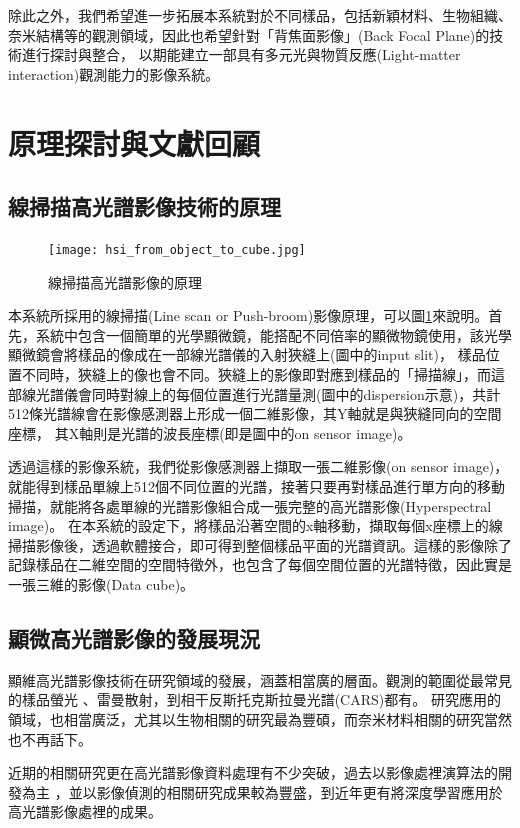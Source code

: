 \documentclass[12pt]{article}
\begin{document}
除此之外，我們希望進一步拓展本系統對於不同樣品，包括新穎材料、生物組織、奈米結構等的觀測領域，因此也希望針對「背焦面影像」(Back Focal Plane)的技術進行探討與整合，
以期能建立一部具有多元光與物質反應(Light-matter interaction)觀測能力的影像系統。

\section{原理探討與文獻回顧}
\subsection{線掃描高光譜影像技術的原理}
\begin{figure}[h]
    \centering
    \texttt{[image: hsi\_from\_object\_to\_cube.jpg]}
    \caption{線掃描高光譜影像的原理}
    \label{fromObjecttoCube}
\end{figure}
本系統所採用的線掃描(Line scan or Push-broom)影像原理，可以圖\ref{fromObjecttoCube}來說明。首先，系統中包含一個簡單的光學顯微鏡，能搭配不同倍率的顯微物鏡使用，該光學顯微鏡會將樣品的像成在一部線光譜儀的入射狹縫上(圖中的input slit)，
樣品位置不同時，狹縫上的像也會不同。狹縫上的影像即對應到樣品的「掃描線」，而這部線光譜儀會同時對線上的每個位置進行光譜量測(圖中的dispersion示意)，共計512條光譜線會在影像感測器上形成一個二維影像，其Y軸就是與狹縫同向的空間座標，
其X軸則是光譜的波長座標(即是圖中的on sensor image)。

透過這樣的影像系統，我們從影像感測器上擷取一張二維影像(on sensor image)，就能得到樣品單線上512個不同位置的光譜，接著只要再對樣品進行單方向的移動掃描，就能將各處單線的光譜影像組合成一張完整的高光譜影像(Hyperspectral image)。
在本系統的設定下，將樣品沿著空間的x軸移動，擷取每個x座標上的線掃描影像後，透過軟體接合，即可得到整個樣品平面的光譜資訊。這樣的影像除了記錄樣品在二維空間的空間特徵外，也包含了每個空間位置的光譜特徵，因此實是一張三維的影像(Data cube)。

\subsection{顯微高光譜影像的發展現況}
顯維高光譜影像技術在研究領域的發展，涵蓋相當廣的層面。觀測的範圍從最常見的樣品螢光
、雷曼散射，到相干反斯托克斯拉曼光譜(CARS)都有\cite{roth2015hyperspectral,zhang2013quantitative, pegoraro2014hyperspectral}。
研究應用的領域，也相當廣泛，尤其以生物相關的研究最為豐碩\cite{leavesley2012hyperspectral,studer2012compressive}，而奈米材料相關的研究當然也不再話下\cite{roth2015hyperspectral}。

近期的相關研究更在高光譜影像資料處理有不少突破，過去以影像處裡演算法的開發為主
\cite{manolakis2002detection,nascimento2005vertex}
，並以影像偵測的相關研究成果較為豐盛\cite{manolakis2009there}，到近年更有將深度學習應用於高光譜影像處裡的成果\cite{chen2014deep}。
\end{document}
